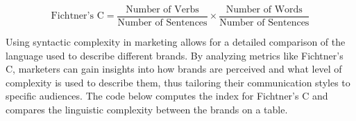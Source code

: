 \[
\text{Fichtner's C} = \frac{\text{Number of Verbs}}{\text{Number of Sentences}} \times \frac{\text{Number of Words}}{\text{Number of Sentences}}
\]

Using syntactic complexity in marketing allows for a detailed comparison of
the language used to describe different brands. By analyzing metrics
like Fichtner's C, marketers can gain insights into how brands are
perceived and what level of complexity is used to describe them, thus
tailoring their communication styles to specific audiences. The code
below computes the index for Fichtner's C and compares the linguistic complexity
between the brands on a table.

\begin{Shaded}
\begin{Highlighting}[]

\OtherTok{\textless{}{-}}\SpecialCharTok{\%\textgreater{}\%}
  \SpecialCharTok{\%\textgreater{}\%}
  \NormalTok{(} \SpecialCharTok{==} \NormalTok{),}
             
             \NormalTok{()) }\SpecialCharTok{\%\textgreater{}\%}
  \NormalTok{(}\SpecialCharTok{/}\SpecialCharTok{*}\SpecialCharTok{/}\SpecialCharTok{\%\textgreater{}\%}
  \NormalTok{()}

\OtherTok{\textless{}{-}}\SpecialCharTok{\%\textgreater{}\%}
  \SpecialCharTok{\%\textgreater{}\%}
  \NormalTok{(}  \NormalTok{),}
              \NormalTok{),}
              \NormalTok{),}
             \NormalTok{())}

\end{Highlighting}
\end{Shaded}

